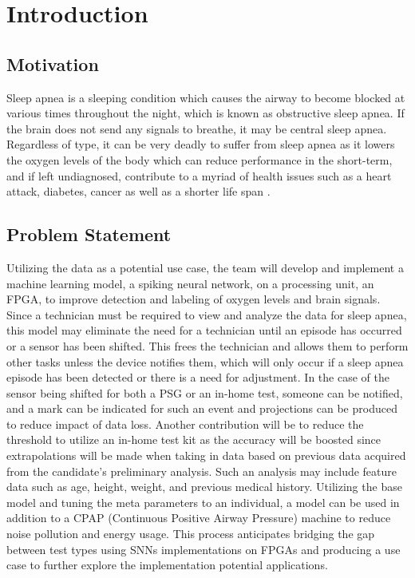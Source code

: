\documentclass[12pt,titlepage]{article}
\begin{document}
\section{Introduction}
\subsection{Motivation}
Sleep apnea is a sleeping condition which causes the airway to become blocked at various times throughout the night, which is known as obstructive sleep apnea. 
If the brain does not send any signals to breathe, it may be central sleep apnea. Regardless of type, it can be very deadly to suffer from sleep apnea as it 
lowers the oxygen levels of the body which can reduce performance in the short-term, and if left undiagnosed, contribute to a myriad of health issues
such as a heart attack, diabetes, cancer as well as a shorter life span \cite{hopkins}.

\subsection{Problem Statement}
Utilizing the data as a potential use case, the team will develop and implement a machine learning model, a spiking neural network, on a processing unit,
an FPGA, to improve detection and labeling of oxygen levels and brain signals.  Since a technician must be required to view and analyze the data for sleep
apnea, this model may eliminate the need for a technician until an episode has occurred or a sensor has been shifted. This frees the technician and allows
them to perform other tasks unless the device notifies them, which will only occur if a sleep apnea episode has been detected or there is a need for adjustment.
In the case of the sensor being shifted for both a PSG or an in-home test, someone can be notified, and a mark can be indicated for such an event and projections
can be produced to reduce impact of data loss. Another contribution will be to reduce the threshold to utilize an in-home test kit as the accuracy will be boosted
since extrapolations will be made when taking in data based on previous data acquired from the candidate’s preliminary analysis. Such an analysis may include
feature data such as age, height, weight, and previous medical history. Utilizing the base model and tuning the meta parameters to an individual, a model can
be used in addition to a CPAP (Continuous Positive Airway Pressure) machine to reduce noise pollution and energy usage. This process anticipates bridging 
the gap between test types using SNNs implementations on FPGAs and producing a use case to further explore the implementation potential applications.  
\end{document}
